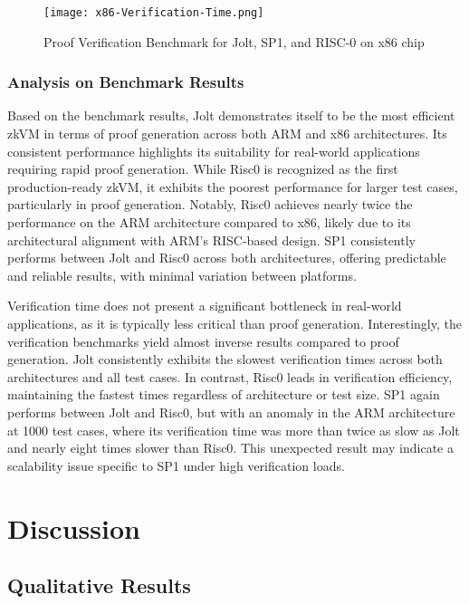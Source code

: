 \documentclass{scrartcl}
\begin{document}
\begin{figure}
	\begin{center}
		\texttt{[image: x86-Verification-Time.png]}
	\end{center}
	\caption{Proof Verification Benchmark for Jolt, SP1, and RISC-0 on x86 chip}
	\label{graph:x86-verification-time}
\end{figure}


\subsubsection{Analysis on Benchmark Results}

Based on the benchmark results, Jolt demonstrates itself to be the most efficient zkVM in terms of proof generation across both ARM and x86 architectures. Its consistent performance highlights its suitability for real-world applications requiring rapid proof generation. While Risc0 is recognized as the first production-ready zkVM, it exhibits the poorest performance for larger test cases, particularly in proof generation. Notably, Risc0 achieves nearly twice the performance on the ARM architecture compared to x86, likely due to its architectural alignment with ARM’s RISC-based design. SP1 consistently performs between Jolt and Risc0 across both architectures, offering predictable and reliable results, with minimal variation between platforms.

Verification time does not present a significant bottleneck in real-world applications, as it is typically less critical than proof generation. Interestingly, the verification benchmarks yield almost inverse results compared to proof generation. Jolt consistently exhibits the slowest verification times across both architectures and all test cases. In contrast, Risc0 leads in verification efficiency, maintaining the fastest times regardless of architecture or test size. SP1 again performs between Jolt and Risc0, but with an anomaly in the ARM architecture at 1000 test cases, where its verification time was more than twice as slow as Jolt and nearly eight times slower than Risc0. This unexpected result may indicate a scalability issue specific to SP1 under high verification loads.\section{Discussion}

\subsection{Qualitative Results}
\end{document}
